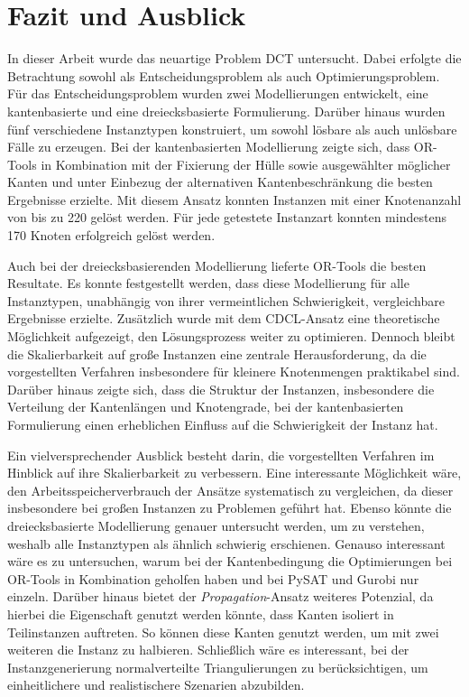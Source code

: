 \chapter{Fazit und Ausblick}
In dieser Arbeit wurde das neuartige Problem DCT untersucht. 
Dabei erfolgte die Betrachtung sowohl als Entscheidungsproblem als auch Optimierungsproblem. 
Für das Entscheidungsproblem wurden zwei Modellierungen entwickelt, eine kantenbasierte und eine dreiecksbasierte Formulierung. 
Darüber hinaus wurden fünf verschiedene Instanztypen konstruiert, um sowohl lösbare als auch unlösbare Fälle zu erzeugen.
Bei der kantenbasierten Modellierung zeigte sich, dass OR-Tools in Kombination mit der Fixierung der Hülle sowie ausgewählter möglicher Kanten und unter Einbezug der alternativen Kantenbeschränkung die besten Ergebnisse erzielte. 
Mit diesem Ansatz konnten Instanzen mit einer Knotenanzahl von bis zu 220 gelöst werden. 
Für jede getestete Instanzart konnten mindestens 170 Knoten erfolgreich gelöst werden. 

Auch bei der dreiecksbasierenden Modellierung lieferte OR-Tools die besten Resultate. 
Es konnte festgestellt werden, dass diese Modellierung für alle Instanztypen, unabhängig von ihrer vermeintlichen Schwierigkeit, vergleichbare Ergebnisse erzielte. 
Zusätzlich wurde mit dem CDCL-Ansatz eine theoretische Möglichkeit aufgezeigt, den Lösungsprozess weiter zu optimieren. 
Dennoch bleibt die Skalierbarkeit auf große Instanzen eine zentrale Herausforderung, da die vorgestellten Verfahren insbesondere für kleinere Knotenmengen praktikabel sind. 
Darüber hinaus zeigte sich, dass die Struktur der Instanzen, insbesondere die Verteilung der Kantenlängen und Knotengrade, bei der kantenbasierten Formulierung einen erheblichen Einfluss auf die Schwierigkeit der Instanz hat.

Ein vielversprechender Ausblick besteht darin, die vorgestellten Verfahren im Hinblick auf ihre Skalierbarkeit zu verbessern. 
Eine interessante Möglichkeit wäre, den Arbeitsspeicherverbrauch der Ansätze systematisch zu vergleichen, da dieser insbesondere bei großen Instanzen zu Problemen geführt hat. 
Ebenso könnte die dreiecksbasierte Modellierung genauer untersucht werden, um zu verstehen, weshalb alle Instanztypen als ähnlich schwierig erschienen. 
Genauso interessant wäre es zu untersuchen, warum bei der Kantenbedingung die Optimierungen bei OR-Tools in Kombination geholfen haben und bei PySAT und Gurobi nur einzeln.
Darüber hinaus bietet der \emph{Propagation}-Ansatz weiteres Potenzial, da hierbei die Eigenschaft genutzt werden könnte, dass Kanten isoliert in Teilinstanzen auftreten. 
So können diese Kanten genutzt werden, um mit zwei weiteren die Instanz zu halbieren.
Schließlich wäre es interessant, bei der Instanzgenerierung normalverteilte Triangulierungen zu berücksichtigen, um einheitlichere und realistischere Szenarien abzubilden.

